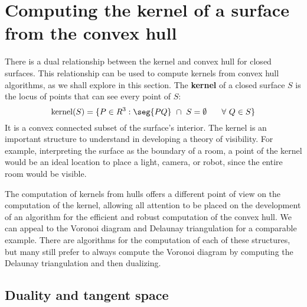 \documentclass[12pt]{article}
\begin{document}


\section{Computing the kernel of a surface from the convex hull}

There is a dual relationship between the kernel and convex hull
for closed surfaces.
This relationship can be used to compute kernels from convex hull algorithms,
as we shall explore in this section.
The {\bf kernel} of a closed surface $S$ is the locus of points that can see every
point of $S$:
\[
\mbox{kernel}(S) = \{ P \in R^3: \seg{PQ} \ \cap \ S = \emptyset 
		\hspace{.25in} \forall \ Q \in S \}
\]
It is a convex connected subset of the surface's interior.
The kernel is an important structure to understand in developing a theory of visibility.
For example, interpreting the surface as the boundary of a room,
a point of the kernel would be an ideal location to place a light, camera, or robot,
since the entire room would be visible.

The computation of kernels from hulls
offers a different point of view on the computation of the kernel,
allowing all attention to be placed on the development of an algorithm
for the efficient and robust computation of the convex hull.
We can appeal to the Voronoi diagram and Delaunay triangulation for a comparable example.
There are algorithms for the computation of each of these structures,
but many still prefer to always compute the Voronoi diagram by computing
the Delaunay triangulation and then dualizing.


\subsection{Duality and tangent space}
\label{sec:duality}
\end{document}
